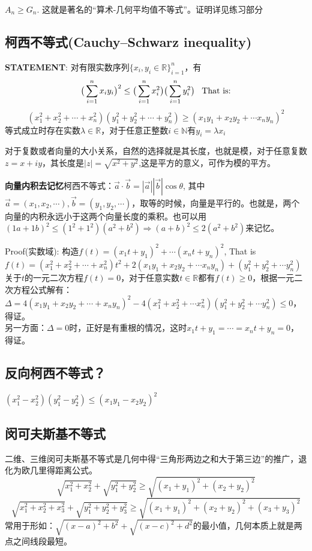 \documentclass[../main.tex]{subfiles}
\begin{document}
 $A_n \ge G_n$. 这就是著名的“算术-几何平均值不等式”。证明详见练习部分

\subsection{柯西不等式(Cauchy–Schwarz inequality)}
\begin{mdframed}
  \textbf{STATEMENT}:
  对有限实数序列$\{x_i, y_i\in \mathbb{R}\}_{i=1}^{n}$，有
  \[
   \big (\sum_{i=1}^nx_iy_i\big)^2 \le \big(\sum_{i=1}^nx_i^2\big)\big(\sum_{i=1}^ny_i^2\big) \text{\;\;\;That is:}
  \]
  \[(x_1^2+x_2^2+\cdots + x_n^2)(y_1^2+y_2^2+\cdots +y_n^2) \ge (x_1y_1+x_2y_2+\cdots x_ny_n)^2\]
  等式成立时存在实数$\lambda \in \mathbb{R}$，对于任意正整数$i\in \mathbb{N}$有$y_i=\lambda x_i$
\end{mdframed}


对于复数或者向量的大小关系，自然的选择就是其长度，也就是模，对于任意复数$z=x+iy$，其长度是$|z|=\sqrt{x^2+y^2}$,这是平方的意义，可作为模的平方。

\textbf{向量内积去记忆}柯西不等式：$\vec{a} \cdot \vec{b} = |\vec{a}| |\vec{b}| \cos \theta$, 其中$\vec{a}=(x_1,x_2,\cdots), \vec{b}=(y_1,y_2,\cdots)$，取等的时候，向量是平行的。也就是，两个向量的内积永远小于这两个向量长度的乘积。也可以用$(1a+1b)^2\le (1^2+1^2)(a^2+b^2) \Rightarrow (a+b)^2\le 2(a^2+b^2)$来记忆。

Proof(实数域): 构造$f(t)=(x_1t+y_1)^2+\cdots (x_nt+y_n)^2$, That is\\
$f(t)=(x_1^2+x_2^2+\cdots +x_n^2)t^2+2(x_1y_1+x_2y_2+\cdots x_ny_n)+(y_1^2+y_2^2+\cdots y_n^2)$\\
关于$t$的一元二次方程$f(t)=0$，对于任意实数$t \in \mathbb{R}$都有$f(t)\ge 0$，根据一元二次方程公式解有：
$\Delta= 4(x_1y_1+x_2y_2+\cdots +x_ny_n)^2-4(x_1^2+x_2^2+\cdots x_n^2)(y_1^2+y_2^2+ \cdots y_n^2) \le 0 $，得证。\\
另一方面：$\Delta =0$时，正好是有重根的情况，这时$x_1t+y_1=\cdots =x_nt+y_n=0$，得证。
\subsection{反向柯西不等式？}
$(x_1^2-x_2^2)(y_1^2-y_2^2) \le (x_1y_1-x_2y_2)^2$

 \subsection{闵可夫斯基不等式}
二维、三维闵可夫斯基不等式是几何中得“三角形两边之和大于第三边”的推广，退化为欧几里得距离公式。
$$ \sqrt{x_1^2+x_2^2} + \sqrt{y_1^2+y_2^2} \ge \sqrt{(x_1+y_1)^2+(x_2+y_2)^2} $$
$$ \sqrt{x_1^2+x_2^2+x_3^2} + \sqrt{y_1^2+y_2^2+y_3^2} \ge \sqrt{(x_1+y_1)^2+(x_2+y_2)^2+(x_3+y_3)^2} $$
常用于形如：$\sqrt{(x-a)^2+b^2} + \sqrt{(x-c)^2+d^2}$的最小值，几何本质上就是两点之间线段最短。
\end{document}
